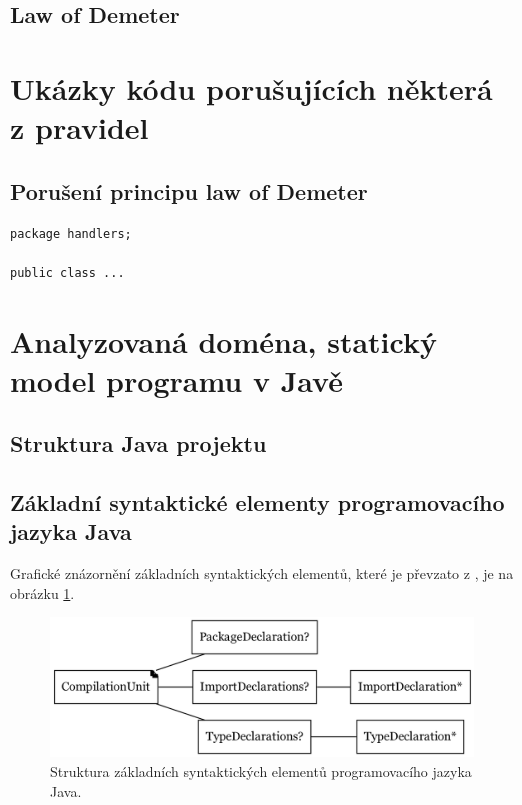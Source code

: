 \subsection{Law of Demeter}

\section{Ukázky kódu porušujících některá z pravidel}

\subsection{Porušení principu law of Demeter}

\begin{verbatim}
package handlers;

public class ...

\end{verbatim}

\section{Analyzovaná doména, statický model programu v Javě}
\subsection{Struktura Java projektu}

\subsection{Základní syntaktické elementy programovacího jazyka Java}
Grafické znázornění základních syntaktických elementů, které je převzato z \cite{Gosling:2005:JLS:1036643}, je na obrázku \ref{toplevel_elements}.
\begin{figure}[h!]
\centering
\includegraphics[width=\textwidth]{./graphs/java_top_elements.png}

\caption{Struktura základních syntaktických elementů programovacího jazyka Java.\label{toplevel_elements}}
\end{figure}
